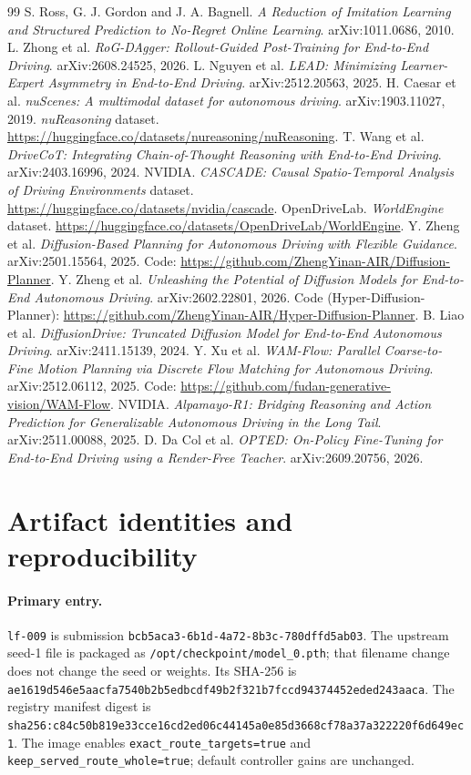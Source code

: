 \documentclass{article}
\newcommand{\lf}{\texttt{lf-009}}
\begin{document}
\begin{thebibliography}{99}
 S. Ross, G. J. Gordon and J. A. Bagnell. \emph{A Reduction of Imitation Learning and Structured Prediction to No-Regret Online Learning}. arXiv:1011.0686, 2010.
 L. Zhong et al. \emph{RoG-DAgger: Rollout-Guided Post-Training for End-to-End Driving}. arXiv:2608.24525, 2026.
 L. Nguyen et al. \emph{LEAD: Minimizing Learner-Expert Asymmetry in End-to-End Driving}. arXiv:2512.20563, 2025.
 H. Caesar et al. \emph{nuScenes: A multimodal dataset for autonomous driving}. arXiv:1903.11027, 2019.
 \emph{nuReasoning} dataset. \url{https://huggingface.co/datasets/nureasoning/nuReasoning}.
 T. Wang et al. \emph{DriveCoT: Integrating Chain-of-Thought Reasoning with End-to-End Driving}. arXiv:2403.16996, 2024.
 NVIDIA. \emph{CASCADE: Causal Spatio-Temporal Analysis of Driving Environments} dataset. \url{https://huggingface.co/datasets/nvidia/cascade}.
 OpenDriveLab. \emph{WorldEngine} dataset. \url{https://huggingface.co/datasets/OpenDriveLab/WorldEngine}.
 Y. Zheng et al. \emph{Diffusion-Based Planning for Autonomous Driving with Flexible Guidance}. arXiv:2501.15564, 2025. Code: \url{https://github.com/ZhengYinan-AIR/Diffusion-Planner}.
 Y. Zheng et al. \emph{Unleashing the Potential of Diffusion Models for End-to-End Autonomous Driving}. arXiv:2602.22801, 2026. Code (Hyper-Diffusion-Planner): \url{https://github.com/ZhengYinan-AIR/Hyper-Diffusion-Planner}.
 B. Liao et al. \emph{DiffusionDrive: Truncated Diffusion Model for End-to-End Autonomous Driving}. arXiv:2411.15139, 2024.
 Y. Xu et al. \emph{WAM-Flow: Parallel Coarse-to-Fine Motion Planning via Discrete Flow Matching for Autonomous Driving}. arXiv:2512.06112, 2025. Code: \url{https://github.com/fudan-generative-vision/WAM-Flow}.
 NVIDIA. \emph{Alpamayo-R1: Bridging Reasoning and Action Prediction for Generalizable Autonomous Driving in the Long Tail}. arXiv:2511.00088, 2025.
 D. Da Col et al. \emph{OPTED: On-Policy Fine-Tuning for End-to-End Driving using a Render-Free Teacher}. arXiv:2609.20756, 2026.
\end{thebibliography}

\appendix
\section{Artifact identities and reproducibility}\label{app:repro}
\paragraph{Primary entry.}
\lf{} is submission \nolinkurl{bcb5aca3-6b1d-4a72-8b3c-780dffd5ab03}. The upstream seed-1 file is packaged as \texttt{/opt/checkpoint/model\_0.pth}; that filename change does not change the seed or weights. Its SHA-256 is \nolinkurl{ae1619d546e5aacfa7540b2b5edbcdf49b2f321b7fccd94374452eded243aaca}. The registry manifest digest is \nolinkurl{sha256:c84c50b819e33cce16cd2ed06c44145a0e85d3668cf78a37a322220f6d649ec1}. The image enables \texttt{exact\_route\_targets=true} and \texttt{keep\_served\_route\_whole=true}; default controller gains are unchanged.
\end{document}
